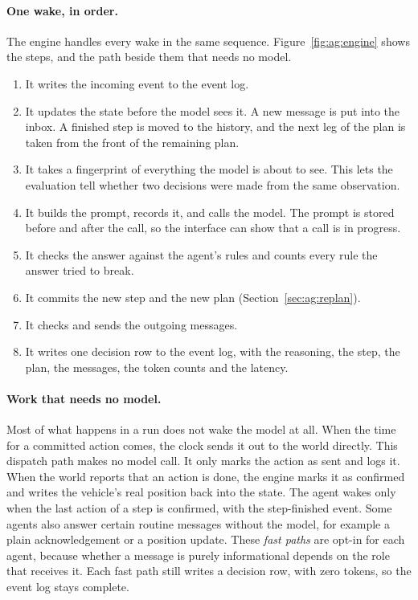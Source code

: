 \paragraph{One wake, in order.} The engine handles every wake in the same
sequence. Figure~\ref{fig:ag:engine} shows the steps, and the path beside them
that needs no model.
\begin{enumerate}
  \item It writes the incoming event to the event log.
  \item It updates the state before the model sees it. A new message is
  put into the inbox. A finished step is moved to the history, and the next
  leg of the plan is taken from the front of the remaining plan.
  \item It takes a fingerprint of everything the model is about to see. This
  lets the evaluation tell whether two decisions were made from the same
  observation.
  \item It builds the prompt, records it, and calls the model. The prompt is
  stored before and after the call, so the interface can show that a call is
  in progress.
  \item It checks the answer against the agent's rules and counts every rule
  the answer tried to break.
  \item It commits the new step and the new plan (Section~\ref{sec:ag:replan}).
  \item It checks and sends the outgoing messages.
  \item It writes one decision row to the event log, with the reasoning, the
  step, the plan, the messages, the token counts and the latency.
\end{enumerate}



\paragraph{Work that needs no model.} Most of what happens in a run does not
wake the model at all. When the time for a committed action comes, the clock
sends it out to the world directly. This dispatch path makes no model call. It
only marks the action as sent and logs it. When the world reports that an
action is done, the engine marks it as confirmed and writes the vehicle's real
position back into the state. The agent wakes only when the last action of a
step is confirmed, with the step-finished event. Some agents also
answer certain routine messages without the model, for example a plain
acknowledgement or a position update. These \emph{fast paths} are opt-in for
each agent, because whether a message is purely informational depends on the
role that receives it. Each fast path still writes a decision row, with zero
tokens, so the event log stays complete.

